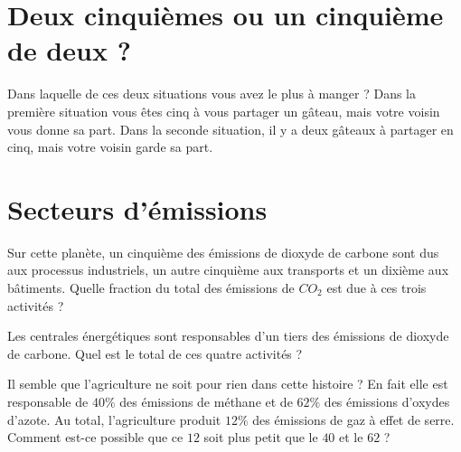 
\section*{Deux cinquièmes ou un cinquième de deux ?}

Dans laquelle de ces deux situations vous avez le plus à manger ? Dans la première situation vous êtes cinq à vous partager un gâteau, mais votre voisin vous donne sa part. Dans la seconde situation, il y a deux gâteaux à partager en cinq, mais votre voisin garde sa part.

\section*{Secteurs d'émissions}

Sur cette planète, un cinquième des émissions de dioxyde de carbone sont dus aux processus industriels, un autre cinquième aux transports et un dixième aux bâtiments. Quelle fraction du total des émissions de \( CO_2\) est due à ces trois activités ?

Les centrales énergétiques sont responsables d'un tiers des émissions de dioxyde de carbone. Quel est le total de ces quatre activités ?

Il semble que l'agriculture ne soit pour rien dans cette histoire ? En fait elle est responsable de \( 40\%\) des émissions de méthane et de \( 62\%\) des émissions d'oxydes d'azote. Au total, l'agriculture produit \( 12\%\) des émissions de gaz à effet de serre. Comment est-ce possible que ce \( 12\) soit plus petit que le \( 40\) et le \( 62\) ?

